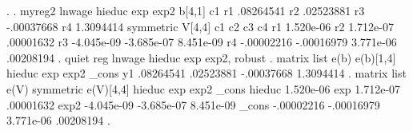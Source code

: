 . 
. myreg2 lnwage hieduc exp exp2 
{\smallskip}
b[4,1]
            c1
r1   .08264541
r2   .02523881
r3  -.00037668
r4   1.3094414
{\smallskip}
symmetric V[4,4]
            c1          c2          c3          c4
r1   1.520e-06
r2   1.712e-07   .00001632
r3  -4.045e-09  -3.685e-07   8.451e-09
r4  -.00002216  -.00016979   3.771e-06   .00208194
{\smallskip}
. quiet reg lnwage hieduc exp exp2, robust
{\smallskip}
. matrix list e(b)
{\smallskip}
e(b)[1,4]
        hieduc         exp        exp2       _cons
y1   .08264541   .02523881  -.00037668   1.3094414
{\smallskip}
. matrix list e(V)
{\smallskip}
symmetric e(V)[4,4]
            hieduc         exp        exp2       _cons
hieduc   1.520e-06
   exp   1.712e-07   .00001632
  exp2  -4.045e-09  -3.685e-07   8.451e-09
 _cons  -.00002216  -.00016979   3.771e-06   .00208194
{\smallskip}
. 
